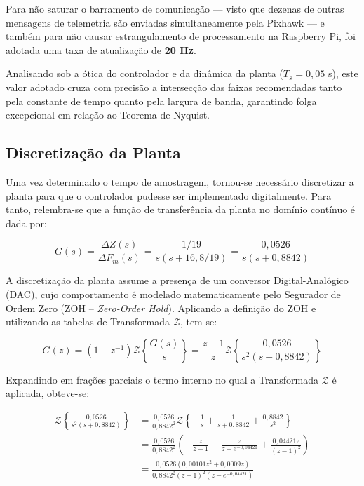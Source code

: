 \documentclass[12pt, a4paper]{article}
\begin{document}
			Para não saturar o barramento de comunicação — visto que dezenas de outras mensagens de telemetria são enviadas simultaneamente pela Pixhawk — e também para não causar estrangulamento de processamento na Raspberry Pi, foi adotada uma taxa de atualização de \textbf{20 Hz}. 

			Analisando sob a ótica do controlador e da dinâmica da planta ($T_s = 0{,}05$ s), este valor adotado cruza com precisão a intersecção das faixas recomendadas tanto pela constante de tempo quanto pela largura de banda, garantindo folga excepcional em relação ao Teorema de Nyquist.

		\subsection{Discretização da Planta}

			Uma vez determinado o tempo de amostragem, tornou-se necessário discretizar a planta para que o controlador pudesse ser implementado digitalmente. Para tanto, relembra-se que a função de transferência da planta no domínio contínuo é dada por:

			\begin{equation}
				G(s) = \frac{\Delta Z(s)}{\Delta F_{m}(s)} = \frac{1/19}{s(s + 16{,}8/19)} = \frac{0{,}0526}{s(s + 0{,}8842)}
			\end{equation}

			A discretização da planta assume a presença de um conversor Digital-Analógico (DAC), cujo comportamento é modelado matematicamente pelo Segurador de Ordem Zero (ZOH -- \textit{Zero-Order Hold}). Aplicando a definição do ZOH e utilizando as tabelas de Transformada $\mathcal{Z}$, tem-se:

			\begin{equation}
				G(z) = (1 - z^{-1})\mathcal{Z}\left\{\frac{G(s)}{s}\right\} = \frac{z-1}{z}\mathcal{Z}\left\{\frac{0{,}0526}{s^2(s + 0{,}8842)}\right\}
			\end{equation}

			Expandindo em frações parciais o termo interno no qual a Transformada $\mathcal{Z}$ é aplicada, obteve-se:

			\begin{align}
				\mathcal{Z}\left\{\frac{0{,}0526}{s^2(s+ 0{,}8842)}\right\}
				&= \frac{0{,}0526}{0{,}8842^2}\mathcal{Z}\left\{-\frac{1}{s}+\frac{1}{s + 0{,}8842} + \frac{0{,}8842}{s^2}\right\} \\
				&= \frac{0{,}0526}{0{,}8842^2}\left(-\frac{z}{z-1} + \frac{z}{z-e^{-0{,}04421}} + \frac{0{,}04421z}{(z-1)^2}\right) \\
				&= \frac{0{,}0526\left(0{,}00101z^2+0{,}0009z\right)}{0{,}8842^2(z-1)^2(z-e^{-0{,}04421})}
			\end{align}
\end{document}
